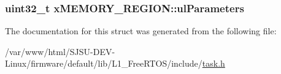 \subsubsection[{\texorpdfstring{ul\+Parameters}{ulParameters}}]{\setlength{\rightskip}{0pt plus 5cm}uint32\+\_\+t x\+M\+E\+M\+O\+R\+Y\+\_\+\+R\+E\+G\+I\+O\+N\+::ul\+Parameters}\hypertarget{structxMEMORY__REGION_a6ba180553e9a318f23acc5f4664934e3}{}\label{structxMEMORY__REGION_a6ba180553e9a318f23acc5f4664934e3}


The documentation for this struct was generated from the following file\+:\begin{DoxyCompactItemize}
\item 
/var/www/html/\+S\+J\+S\+U-\/\+D\+E\+V-\/\+Linux/firmware/default/lib/\+L1\+\_\+\+Free\+R\+T\+O\+S/include/\hyperlink{task_8h}{task.\+h}\end{DoxyCompactItemize}
